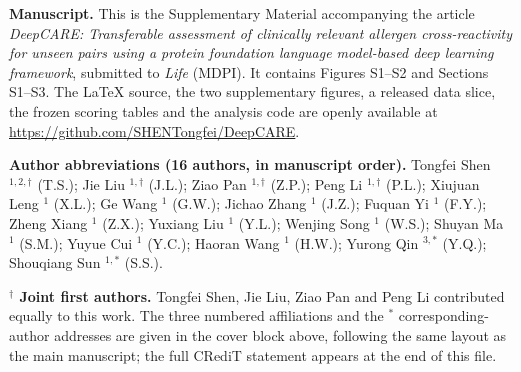 \documentclass[life,supfile,submit,pdftex,moreauthors]{mdpi}
\begin{document}
\nolinenumbers  %

\maketitlen
\let\maketitlen\relax
\vspace{14pt}
\abstractkeywords

\vspace{10pt}
{\fontsize{9}{11.5}\selectfont
\noindent\textbf{Manuscript.} This is the Supplementary Material accompanying
the article \textit{DeepCARE: Transferable assessment of clinically relevant
allergen cross-reactivity for unseen pairs using a protein foundation language
model-based deep learning framework}, submitted to \textit{Life} (MDPI). It
contains Figures S1--S2 and Sections S1--S3. The LaTeX source, the two
supplementary figures, a released data slice, the frozen scoring tables and
the analysis code are openly available at
\url{https://github.com/SHENTongfei/DeepCARE}.

\vspace{6pt}
\noindent\textbf{Author abbreviations (16 authors, in manuscript order).}
Tongfei Shen $^{1,2,\dagger}$ (T.S.);
Jie Liu $^{1,\dagger}$ (J.L.);
Ziao Pan $^{1,\dagger}$ (Z.P.);
Peng Li $^{1,\dagger}$ (P.L.);
Xiujuan Leng $^{1}$ (X.L.);
Ge Wang $^{1}$ (G.W.);
Jichao Zhang $^{1}$ (J.Z.);
Fuquan Yi $^{1}$ (F.Y.);
Zheng Xiang $^{1}$ (Z.X.);
Yuxiang Liu $^{1}$ (Y.L.);
Wenjing Song $^{1}$ (W.S.);
Shuyan Ma $^{1}$ (S.M.);
Yuyue Cui $^{1}$ (Y.C.);
Haoran Wang $^{1}$ (H.W.);
Yurong Qin $^{3,*}$ (Y.Q.);
Shouqiang Sun $^{1,*}$ (S.S.).

\vspace{6pt}
\noindent\textbf{$^{\dagger}$ Joint first authors.}
Tongfei Shen, Jie Liu, Ziao Pan and Peng Li contributed equally to this work.
The three numbered affiliations and the $^{*}$ corresponding-author
addresses are given in the cover block above, following the same layout as
the main manuscript; the full CRediT statement appears at the end of this file.
}
\end{document}
